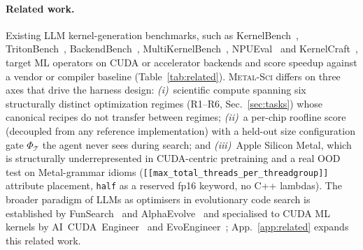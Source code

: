 \documentclass{article}
\theoremstyle{plain}
\theoremstyle{definition}
\theoremstyle{remark}
\begin{document}
\paragraph{Related work.} Existing LLM kernel-generation benchmarks, such as KernelBench~\cite{ouyang2025kernelbench},
TritonBench~\cite{li2025tritonbench},
BackendBench~\cite{saroufim2025backendbench},
MultiKernelBench~\cite{wen2025multikernelbench},
NPUEval~\cite{kalade2025npueval} and
KernelCraft~\cite{nie2026kernelcraft},
target ML operators on CUDA or accelerator backends and score speedup
against a vendor or compiler baseline (Table~\ref{tab:related}).
\textsc{Metal-Sci} differs on three axes that drive the harness
design: \emph{(i)}~scientific compute spanning six structurally
distinct optimization regimes (R1--R6, Sec.~\ref{sec:tasks}) whose
canonical recipes \cite{datta,nyland2007fast,schonherr2011multi,anderson2008general,govindaraju2008high}
do not transfer between regimes; \emph{(ii)}~a per-chip roofline
score (decoupled from any reference implementation) with a held-out
size configuration gate $\Phi_\mathcal{T}$ the agent never sees during search;
and \emph{(iii)}~Apple Silicon Metal, which is structurally underrepresented
in CUDA-centric pretraining and a real OOD test on Metal-grammar
idioms (\texttt{[[max\_total\_threads\_per\_threadgroup]]} attribute
placement, \texttt{half} as a reserved fp16 keyword, no C++ lambdas).
The broader paradigm of LLMs as optimisers in evolutionary code
search is established by FunSearch~\cite{funsearch} and
AlphaEvolve~\cite{novikov2025alphaevolve} and specialised to CUDA ML
kernels by AI~CUDA~Engineer~\cite{lange2025towards} and
EvoEngineer~\cite{guo2025evoengineer}; App.~\ref{app:related} expands
this related work.
\end{document}
